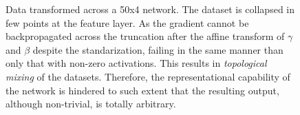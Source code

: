 \begin{figure}
{{    %
    }
    \parbox{.195\textwidth}{%
    }
  }
  \caption{Data transformed across a 50x4 \ReLUBN network. The dataset is collapsed in few points at the feature layer. As the gradient cannot be backpropagated across the truncation after the affine transform of $\gamma$ and $\beta$ despite the standarization, failing in the same manner than \ReLU only that with non-zero activations. This results in \emph{topological mixing} of the datasets. Therefore, the representational capability of the network is hindered to such extent that the resulting output, although non-trivial, is totally arbitrary.}
    \label{fig:moonsReLUBN}
\end{figure}


